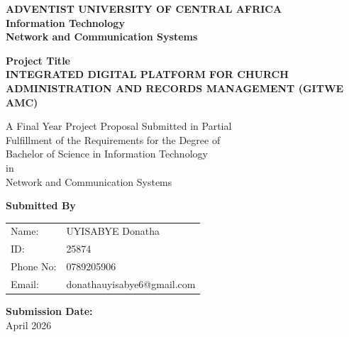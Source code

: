 \documentclass[12pt]{report}
\begin{document}
\thispagestyle{empty}
\begin{center}
\vspace*{0in}
{\fontsize{14}{16.8}\selectfont \textbf{ADVENTIST UNIVERSITY OF CENTRAL AFRICA}} \\
{\fontsize{14}{16.8}\selectfont \textbf{Information Technology}} \\
{\fontsize{14}{16.8}\selectfont \textbf{Network and Communication Systems}}

\vfill
{\fontsize{16}{22}\selectfont\bfseries Project Title \\
INTEGRATED DIGITAL PLATFORM FOR CHURCH ADMINISTRATION AND RECORDS MANAGEMENT (GITWE AMC)}

\vfill
{\fontsize{12}{16.8}\selectfont A Final Year Project Proposal Submitted in Partial \\
Fulfillment of the Requirements for the Degree of \\
Bachelor of Science in Information Technology \\
in \\
Network and Communication Systems}

\vfill
{\fontsize{12}{16.8}\selectfont \textbf{Submitted By} \\
\vspace{0.3in}
\begin{tabular}{ll}
    Name: & UYISABYE Donatha  \\
    ID: & 25874 \\
    Phone No: & 0789205906 \\
    Email: & donathauyisabye6@gmail.com \\
\end{tabular}}

\vfill
{\fontsize{12}{16.8}\selectfont \textbf{Submission Date:} \\
April 2026}
\end{center}

\newpage
{}
\tableofcontents
\newpage
{}
\listoffigures
\newpage
\end{document}
